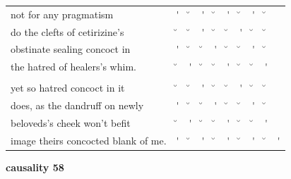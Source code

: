 \documentclass[12pt, landscape]{article}
\begin{document}
\begin{center}
\begin{tabularx}{\textwidth}{
>{\lefting\arraybackslash}X
c
c
c
c
c
c
c
c
c
}

not for any pragmatism & \'{} & \u{} & \'{} & \u{} & \'{} & \u{} & \'{} & \u{} & \\
do the clefts of cetirizine's & \u{} & \u{} & \'{} & \u{} & \u{} & \'{} & \u{} & \u{} & \\
obstinate sealing concoct in & \'{} & \u{} & \u{} & \'{} & \u{} & \u{} & \'{} & \u{} & \\
the hatred of healers's whim. & \u{} & \'{} & \u{} & \u{} & \'{} & \u{} & \u{} & \'{} & \\
 & & & & & & & & \\
yet so hatred concoct in it  & \u{} & \u{} & \'{} & \u{} & \u{} & \'{} & \u{} & \u{} & \\
does, as the dandruff on newly & \'{} & \u{} & \u{} & \'{} & \u{} & \u{} & \'{} & \u{} & \\
beloveds's cheek won't befit & \u{} & \'{} & \u{} & \u{} & \'{} & \u{} & \u{} & \'{} & \\
image theirs concocted blank of me. & \'{} & \u{} & \'{} & \u{} & \'{} & \u{} & \'{} & \u{} & \'{} \\

\end{tabularx}
\end{center}

\vspace*{\fill}

\newpage

\vspace*{\fill}

\noindent \textbf{causality 58}
\noindent \hfill \par
\end{document}

